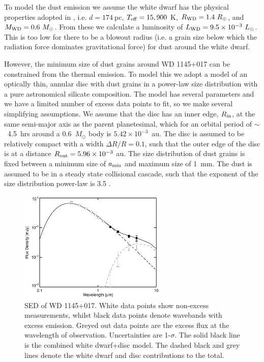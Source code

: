 \documentclass[iop,useAMES,usenatbig]{emulateapj}
\begin{document}
To model the dust emission we assume the white dwarf has the physical properties adopted in \cite{2015Natur.526..546V}, i.e. $d = 174~$pc, $T_{\rm eff} = 15,900~$K, $R_{\rm WD} = 1.4~R_{\oplus}$, and $M_{\rm WD} = 0.6~M_{\odot}$. From these we calculate a luminosity of $L_{\rm WD} = 9.5\times10^{-3}~L_{\odot}$. This is too low for there to be a blowout radius (i.e. a grain size below which the radiation force dominates gravitational force) for dust around the white dwarf. 

However, the minimum size of dust grains around WD 1145+017 can be constrained from the thermal emission. To model this we adopt a model of an optically thin, annular disc with dust grains in a power-law size distribution with a pure astronomical silicate composition. The model has several parameters and we have a limited number of excess data points to fit, so we make several simplifying assumptions. We assume that the disc has an inner edge, $R_{\rm in}$, at the same semi-major axis as the parent planetesimal, which for an orbital period of $\sim$~4.5~hrs around a 0.6~$M_{\odot}$ body is $5.42\times10^{-3}$~au. The disc is assumed to be relatively compact with a width $\Delta R/R = 0.1$, such that the outer edge of the disc is at a distance $R_{\rm out} = 5.96\times10^{-3}~$au. The size distribution of dust grains is fixed between a minimum size of $a_{\rm min}$ and maximum size of 1~mm. The dust is assumed to be in a steady state collisional cascade, such that the exponent of the size distribution power-law is 3.5 \citep{1969JGR....74.2531D}.

\begin{figure}
    \centering
    \includegraphics[width=7cm]{plots/wd1145p017_sed_astrosil.eps}
    \caption{SED of WD 1145+017. White data points show non-excess measurements, whilst black data points denote wavebands with excess emission. Greyed out data points are the excess flux at the wavelength of observation. Uncertainties are 1-$\sigma$. The solid black line is the combined white dwarf+disc model. The dashed black and grey lines denote the white dwarf and disc contributions to the total. \label{fig:wd1145p017_sed}}
\end{figure}
\end{document}
